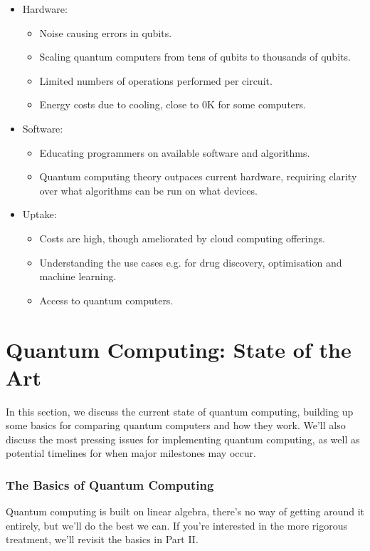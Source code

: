 \documentclass{article}
\theoremstyle{definition}
\begin{document}
\begin{itemize}
    \item Hardware: 
    \begin{itemize}
        \item Noise causing errors in qubits.
        \item Scaling quantum computers from tens of qubits to thousands of qubits.
        \item Limited numbers of operations performed per circuit.
        \item Energy costs due to cooling, close to 0K for some computers. 
    \end{itemize}
    \item Software:
    \begin{itemize}
        \item Educating programmers on available software and algorithms.
        
        \item Quantum computing theory outpaces current hardware, requiring clarity over what algorithms can be run on what devices.
    \end{itemize}
    \item Uptake:
    \begin{itemize}
        \item Costs are high, though ameliorated by cloud computing offerings.
        \item Understanding the use cases e.g. for drug discovery, optimisation and machine learning.
        \item Access to quantum computers. 
    \end{itemize}
\end{itemize}


\clearpage
\tableofcontents

\clearpage
\part{Quantum Computing: State of the Art}
In this section, we discuss the current state of quantum computing, building up some basics for comparing quantum computers and how they work. We'll also discuss the most pressing issues for implementing quantum computing, as well as potential timelines for when major milestones may occur. 


\section{The Basics of Quantum Computing}
Quantum computing is built on linear algebra, there's no way of getting around it entirely, but we'll do the best we can. If you're interested in the more rigorous treatment, we'll revisit the basics in Part II.
\end{document}
